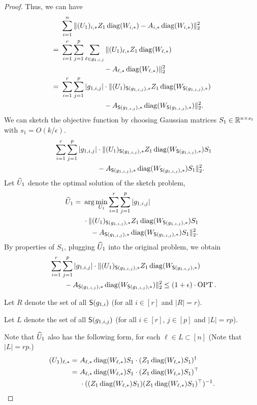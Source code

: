 \begin{proof}
Thus, we can have 
\begin{align*}
    & ~ \sum_{i=1}^n \| (U_1)_{i,*} Z_1 \diag( W_{i,*} ) - A_{i,*} \diag( W_{i,*} ) \|_2^2 \\
    = & ~ \sum_{i=1}^r \sum_{j =1}^p \sum_{\ell \in g_{1,i,j}} \| (U_1)_{\ell,*} Z_1 \diag( W_{\ell,*} ) \\
     & ~ \quad\quad\quad\quad\quad\quad - A_{\ell,*} \diag( W_{\ell,*} ) \|_2^2 \\
    = & ~\sum_{i=1}^r \sum_{j =1}^p |g_{1,i,j}| \cdot \| (U_1)_{\S(g_{1,i,j}),*} Z_1 \diag( W_{ \S(g_{1,i,j}),*} ) \\
    & ~ \quad\quad\quad\quad\quad\quad - A_{\S(g_{1,i,j}),*} \diag( W_{\S(g_{1,i,j}),*} ) \|_2^2 .
\end{align*}
We can sketch the objective function by choosing Gaussian matrices $S_1 \in \R^{n \times s_1}$ with $s_1 = O(k/\epsilon)$.
\begin{align*}
& ~ \sum_{i=1}^r \sum_{j =1}^p |g_{1,i,j}| \cdot \| (U_1)_{\S(g_{1,i,j}),*} Z_1 \diag( W_{ \S(g_{1,i,j}),*} ) S_1 \\
& ~ \quad\quad\quad\quad\quad\quad - A_{\S(g_{1,i,j}),*} \diag( W_{\S(g_{1,i,j}),*} ) S_1 \|_2^2.
\end{align*}
Let $\wh{U}_1$ denote the optimal solution of the sketch problem,
\begin{align*}
    \wh{U}_1 = & ~ \arg\min_{U_1} \sum_{i=1}^r \sum_{j =1}^p |g_{1,i,j}| \\
    & ~ \cdot \| (U_1)_{\S(g_{1,i,j}),*} Z_1 \diag( W_{ \S(g_{1,i,j}),*} ) S_1 \\
    & ~ \quad - A_{\S(g_{1,i,j}),*} \diag( W_{\S(g_{1,i,j}),*} ) S_1 \|_2^2.
\end{align*}
By properties of $S_1$, plugging $\wh{U}_1$ into the original problem, we obtain
\begin{align*}
& ~ \sum_{i=1}^r \sum_{j =1}^p |g_{1,i,j}| \cdot \| (U_1)_{\S(g_{1,i,j}),*} Z_1 \diag( W_{ \S(g_{1,i,j}),*} ) \\
& ~ \quad\quad - A_{\S(g_{1,i,j}),*} \diag( W_{\S(g_{1,i,j}),*} ) \|_2^2 \leq (1+\epsilon) \cdot \OPT.
\end{align*}

Let $R$ denote the set of all $\S(g_{1,i})$ (for all $i \in [r]$ and $|R| = r$).

Let $L$ denote the set of all $\S(g_{1,i,j})$ (for all $i \in [r]$, $j \in [p]$ and $|L| = rp$).

Note that $\wh{U}_1$ also has the following form, for each $\ell \in L \subset [n]$ (Note that $|L| = r p$.)
\begin{align*}
(U_1)_{\ell, *} 
= & ~ A_{\ell,*} \diag(W_{\ell,*}) S_1 \cdot ( Z_1 \diag( W_{\ell,*} ) S_1 )^\dagger \\
= & ~  A_{\ell,*} \diag(W_{\ell,*}) S_1 \cdot ( Z_1 \diag( W_{\ell,*} ) S_1 )^\top \\
& ~ \cdot ( ( Z_1 \diag( W_{\ell,*} ) S_1 ) ( Z_1 \diag( W_{\ell,*} ) S_1 )^\top )^{-1}.
\end{align*}


\end{proof}
